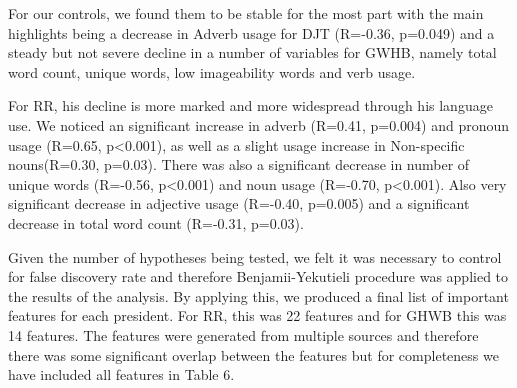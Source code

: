\documentclass[12pt]{article}
\begin{document}
For our controls, we found them to be stable for the most part with the main highlights being a decrease in Adverb usage for DJT (R=-0.36, p=0.049) and a steady but not severe decline in a number of variables for GWHB, namely total word count, unique words, low imageability words and verb usage.
\par 
For RR, his decline is more marked and more widespread through his language use. We noticed an significant increase in adverb (R=0.41, p=0.004) and pronoun usage (R=0.65, p\textless0.001), as well as a slight usage increase in Non-specific nouns(R=0.30, p=0.03). There was also a significant decrease in number of unique words (R=-0.56, p\textless0.001) and noun usage (R=-0.70, p\textless0.001). Also very significant decrease in adjective usage (R=-0.40, p=0.005) and a significant decrease in total word count (R=-0.31, p=0.03). 
\par
Given the number of hypotheses being tested, we felt it was necessary to control for false discovery rate and therefore Benjamii-Yekutieli procedure was applied to the results of the analysis. By applying this, we produced a final list of important features for each president. For RR, this was 22 features and for GHWB this was 14 features.  The features were generated from multiple sources and therefore there was some significant overlap between the features but for completeness we have included all features in Table 6. 
\end{document}
